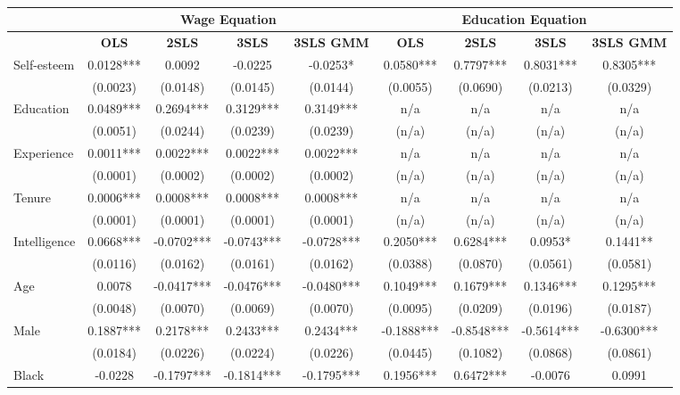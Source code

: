 \documentclass[12pt]{report}
\newcommand{\prbf}[1]{\textbf{#1}}
\begin{document}
\newpage
\begin{sidewaystable}
\small
\caption{\label{tab:wage87b}}
\vspace{2pt}
\centering\begin{tabular}{lc|c|c|c|c|c|c|c}
\hline
\hline
& \multicolumn{4}{|c|}{Wage Equation} & \multicolumn{4}{|c}{Education Equation}\\
\hline
& \prbf{OLS} & \prbf{2SLS} & \prbf{3SLS} & \prbf{3SLS GMM} & \prbf{OLS} & \prbf{2SLS} & \prbf{3SLS} & \prbf{3SLS GMM}\\
\hline
Self-esteem & 0.0128*** & 0.0092 & -0.0225 & -0.0253* & 0.0580*** & 0.7797*** & 0.8031*** & 0.8305***\\
& (0.0023) & (0.0148) & (0.0145) & (0.0144) & (0.0055) & (0.0690) & (0.0213) & (0.0329)\\
Education & 0.0489*** & 0.2694*** & 0.3129*** & 0.3149*** & n/a & n/a & n/a & n/a\\
& (0.0051) & (0.0244) & (0.0239) & (0.0239) & (n/a) & (n/a) & (n/a) & (n/a)\\
Experience & 0.0011*** & 0.0022*** & 0.0022*** & 0.0022*** & n/a & n/a & n/a & n/a\\
& (0.0001) & (0.0002) & (0.0002) & (0.0002) & (n/a) & (n/a) & (n/a) & (n/a)\\
Tenure & 0.0006*** & 0.0008*** & 0.0008*** & 0.0008*** & n/a & n/a & n/a & n/a\\
& (0.0001) & (0.0001) & (0.0001) & (0.0001) & (n/a) & (n/a) & (n/a) & (n/a)\\
Intelligence & 0.0668*** & -0.0702*** & -0.0743*** & -0.0728*** & 0.2050*** & 0.6284*** & 0.0953* & 0.1441**\\
& (0.0116) & (0.0162) & (0.0161) & (0.0162) & (0.0388) & (0.0870) & (0.0561) & (0.0581)\\
Age & 0.0078 & -0.0417*** & -0.0476*** & -0.0480*** & 0.1049*** & 0.1679*** & 0.1346*** & 0.1295***\\
& (0.0048) & (0.0070) & (0.0069) & (0.0070) & (0.0095) & (0.0209) & (0.0196) & (0.0187)\\
Male & 0.1887*** & 0.2178*** & 0.2433*** & 0.2434*** & -0.1888*** & -0.8548*** & -0.5614*** & -0.6300***\\
& (0.0184) & (0.0226) & (0.0224) & (0.0226) & (0.0445) & (0.1082) & (0.0868) & (0.0861)\\
Black & -0.0228 & -0.1797*** & -0.1814*** & -0.1795*** & 0.1956*** & 0.6472*** & -0.0076 & 0.0991\\

\end{tabular}
\end{sidewaystable}
\end{document}

